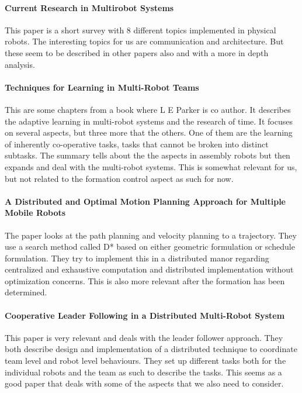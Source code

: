 \paragraph{Current Research in Multirobot Systems}
This paper is a short survey with 8 different topics implemented in physical robots. The interesting topics for us are communication and architecture.
But these seem to be described in other papers also and with a more in depth analysis.

\paragraph{Techniques for Learning in Multi-Robot Teams}
This are some chapters from a book where L E Parker is co author. It describes the adaptive learning in multi-robot systems and the research of time. It focuses on several aspects, but three more that the others. One of them are the learning of inherently co-operative tasks, tasks that cannot be broken into distinct subtasks. The summary tells about the the aspects in assembly robots but then expands and deal with the multi-robot systems.
This is somewhat relevant for us, but not related to the formation control aspect as such for now.

\paragraph{A Distributed and Optimal Motion Planning Approach for Multiple Mobile Robots}
The paper looks at the path planning and velocity planning to a trajectory. They use a search method called D* based on either geometric formulation or schedule formulation. They try to implement this in a distributed manor regarding centralized and exhaustive computation and distributed implementation without optimization concerns.
This is also more relevant after the formation has been determined.

\paragraph{Cooperative Leader Following in a Distributed Multi-Robot System}
This paper is very relevant and deals with the leader follower approach. They both describe design and implementation of a distributed technique to coordinate team level and robot level behaviours. They set up different tasks both for the individual robots and the team as such to describe the tasks.
This seems as a good paper that deals with some of the aspects that we also need to consider.


